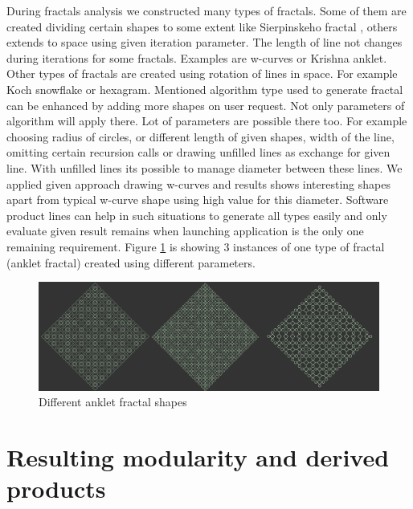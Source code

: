 \documentclass[11pt,english,a4paper,twoside]{article}
\begin{document}
During fractals analysis we constructed many types of fractals. Some of them are created dividing certain shapes to some extent like Sierpinskeho fractal \cite{pelanek_programatorska_2012}, others extends to space using given iteration parameter. The length of line not changes during iterations for some fractals. Examples are w-curves or Krishna anklet. Other types of fractals are created using rotation of lines in space. For example Koch snowflake or hexagram. Mentioned algorithm type used to generate fractal can be enhanced by adding more shapes on user request. Not only parameters of algorithm will apply there. Lot of parameters are possible there too. For example choosing radius of circles, or different length of given shapes, width of the line, omitting certain recursion calls or drawing unfilled lines as exchange for given line. With unfilled lines its possible to manage diameter between these lines. We applied given approach drawing w-curves and results shows interesting shapes apart from typical w-curve shape using high value for this diameter. Software product lines can help in such situations to generate all types easily and only evaluate given result remains when launching application is the only one remaining requirement. Figure \ref{ankletFractalTypes} is showing 3 instances of one type of fractal (anklet fractal) created using different parameters.

\begin{figure}[H]  %
					\begin{center}
									\includegraphics[width=\linewidth]{fig/fractalsAnklet.png}
									\caption{Different anklet fractal shapes}
									\label{ankletFractalTypes}
					\end{center}
\end{figure}



\section{Resulting modularity and derived products} \label{resultingModularity}
\end{document}
